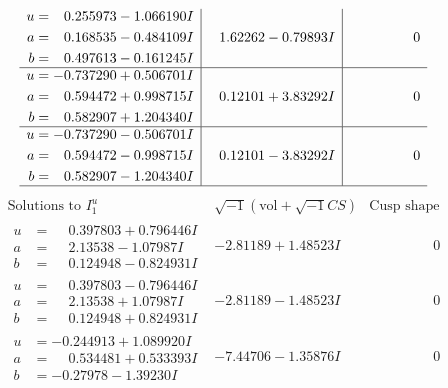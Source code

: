 \documentclass[1p]{elsarticle_modified}
\theoremstyle{definition}
\newcommand{\I}{\sqrt{-1}}
\begin{document}
$$\begin{array}{c|c|c}
\begin{aligned}
u &= \phantom{-}0.255973 - 1.066190 I \\
a &= \phantom{-}0.168535 - 0.484109 I \\
b &= \phantom{-}0.497613 - 0.161245 I\end{aligned}
 & \phantom{-}1.62262 - 0.79893 I & \phantom{-0.000000 } 0 \\ \hline\begin{aligned}
u &= -0.737290 + 0.506701 I \\
a &= \phantom{-}0.594472 + 0.998715 I \\
b &= \phantom{-}0.582907 + 1.204340 I\end{aligned}
 & \phantom{-}0.12101 + 3.83292 I & \phantom{-0.000000 } 0 \\ \hline\begin{aligned}
u &= -0.737290 - 0.506701 I \\
a &= \phantom{-}0.594472 - 0.998715 I \\
b &= \phantom{-}0.582907 - 1.204340 I\end{aligned}
 & \phantom{-}0.12101 - 3.83292 I & \phantom{-0.000000 } 0\\
 \hline 
 \end{array}$$\newpage$$\begin{array}{c|c|c}  
\text{Solutions to }I^u_{1}& \I (\text{vol} + \sqrt{-1}CS) & \text{Cusp shape}\\
 \hline 
\begin{aligned}
u &= \phantom{-}0.397803 + 0.796446 I \\
a &= \phantom{-}2.13538 - 1.07987 I \\
b &= \phantom{-}0.124948 - 0.824931 I\end{aligned}
 & -2.81189 + 1.48523 I & \phantom{-0.000000 } 0 \\ \hline\begin{aligned}
u &= \phantom{-}0.397803 - 0.796446 I \\
a &= \phantom{-}2.13538 + 1.07987 I \\
b &= \phantom{-}0.124948 + 0.824931 I\end{aligned}
 & -2.81189 - 1.48523 I & \phantom{-0.000000 } 0 \\ \hline\begin{aligned}
u &= -0.244913 + 1.089920 I \\
a &= \phantom{-}0.534481 + 0.533393 I \\
b &= -0.27978 - 1.39230 I\end{aligned}
 & -7.44706 - 1.35876 I & \phantom{-0.000000 } 0 \\ \hline\begin{aligned}

\end{aligned}
\end{array}$$
\end{document}
